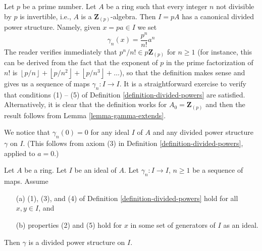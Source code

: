 \begin{example}
\label{example-ideal-generated-by-p}
Let $p$ be a prime number.
Let $A$ be a ring such that every integer $n$ not divisible by $p$
is invertible, i.e., $A$ is a $\mathbf{Z}_{(p)}$-algebra. Then
$I = pA$ has a canonical divided power structure. Namely, given
$x = pa \in I$ we set
$$
\gamma_n(x) = \frac{p^n}{n!} a^n
$$
The reader verifies immediately that $p^n/n! \in p\mathbf{Z}_{(p)}$
for $n \geq 1$ (for instance, this can be derived from the fact
that the exponent of $p$ in the prime factorization of $n!$ is
$\left\lfloor p/n \right\rfloor + \left\lfloor p/n^2 \right\rfloor
+ \left\lfloor p/n^3 \right\rfloor + \ldots$),
so that the definition makes sense and gives us a sequence of
maps $\gamma_n : I \to I$. It is a straightforward exercise to
verify that conditions (1) -- (5) of
Definition \ref{definition-divided-powers} are satisfied.
Alternatively, it is clear that the definition works for
$A_0 = \mathbf{Z}_{(p)}$ and then the result follows from
Lemma \ref{lemma-gamma-extends}.
\end{example}

\noindent
We notice that $\gamma_n\left(0\right) = 0$ for any ideal $I$ of
$A$ and any divided power structure $\gamma$ on $I$. (This follows
from axiom (3) in Definition \ref{definition-divided-powers},
applied to $a=0$.)

\begin{lemma}
\label{lemma-check-on-generators}
Let $A$ be a ring. Let $I$ be an ideal of $A$. Let $\gamma_n : I \to I$,
$n \geq 1$ be a sequence of maps. Assume
\begin{enumerate}
\item[(a)] (1), (3), and (4) of Definition \ref{definition-divided-powers}
hold for all $x, y \in I$, and
\item[(b)] properties (2) and (5) hold for $x$ in
some set of generators of $I$ as an ideal.
\end{enumerate}
Then $\gamma$ is a divided power structure on $I$.
\end{lemma}

